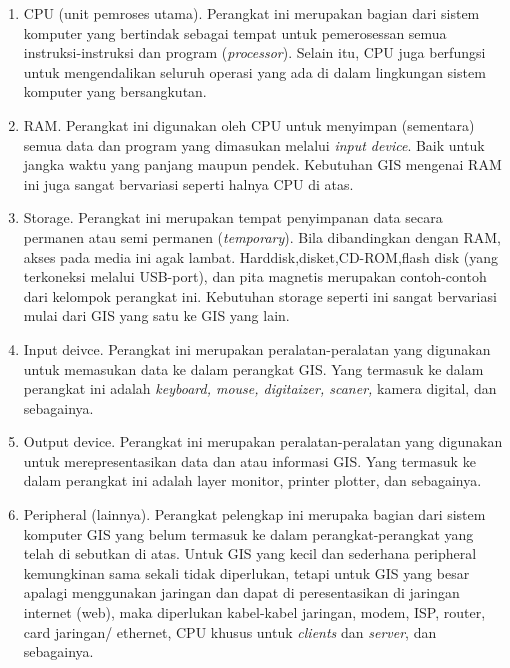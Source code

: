 \begin{enumerate}
\item CPU (unit pemroses utama). Perangkat ini merupakan bagian dari sistem komputer yang bertindak sebagai tempat untuk pemerosessan semua instruksi-instruksi dan program (\textit{processor}). Selain itu, CPU juga berfungsi untuk mengendalikan seluruh operasi yang ada di dalam lingkungan sistem komputer yang bersangkutan.

\item RAM. Perangkat ini digunakan oleh CPU untuk menyimpan (sementara) semua data dan program yang dimasukan melalui \textit{input device}. Baik untuk jangka waktu yang panjang maupun pendek. Kebutuhan GIS mengenai RAM ini juga sangat bervariasi seperti halnya CPU di atas. 

\item Storage. Perangkat ini merupakan tempat penyimpanan data secara permanen atau semi permanen (\textit{temporary}). Bila dibandingkan dengan RAM, akses pada media ini agak lambat. Harddisk,disket,CD-ROM,flash disk (yang terkoneksi melalui USB-port), dan pita magnetis merupakan contoh-contoh dari kelompok perangkat ini. Kebutuhan storage seperti ini sangat bervariasi mulai dari GIS yang satu ke GIS yang lain.

\item Input deivce. Perangkat ini merupakan peralatan-peralatan yang digunakan untuk memasukan data ke dalam perangkat GIS. Yang termasuk ke dalam perangkat ini adalah \textit{keyboard, mouse, digitaizer, scaner,} kamera digital, dan sebagainya.

\item Output device. Perangkat ini merupakan peralatan-peralatan yang digunakan untuk merepresentasikan data dan atau informasi GIS. Yang termasuk ke dalam perangkat ini adalah layer monitor, printer plotter, dan sebagainya.

\item Peripheral (lainnya). Perangkat pelengkap ini merupaka bagian dari sistem komputer GIS yang belum termasuk ke dalam perangkat-perangkat yang telah di sebutkan di atas. Untuk GIS yang kecil dan sederhana peripheral kemungkinan sama sekali tidak diperlukan, tetapi untuk GIS yang besar apalagi menggunakan jaringan dan dapat di peresentasikan di jaringan internet (web), maka diperlukan kabel-kabel jaringan, modem, ISP, router, card jaringan/ ethernet, CPU khusus untuk \textit{clients} dan \textit{server}, dan sebagainya.
\end{enumerate}

